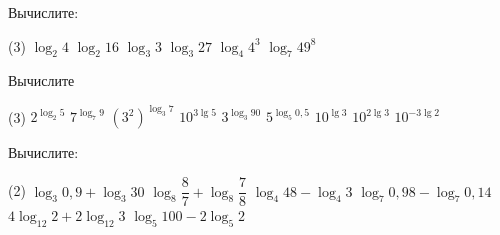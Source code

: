 \begin{class}[number=6]
\begin{listofex}[resume]
\begin{tasks}
		\end{tasks}
		
	\end{listofex}
\end{class}

\begin{homework}[number=3]
	\begin{listofex}
		\item Вычислите:
		\begin{tasks}(3)
			\task \( \log_2 4 \)
			\task \( \log_2 16 \)
			\task \( \log_3 3 \)
			\task \( \log_3 27 \)
			\task \( \log_4 4^3 \)
			\task \( \log_7 49^8 \)
		\end{tasks}
		\item Вычислите
		\begin{tasks}(3)
			\task \( 2^{\log_2 5} \)
			\task \( 7^{\log_7 9} \)
			\task \( (3^2)^{\log_3 7} \)
			\task \( 10^{3\lg 5} \)
			\task \( 3^{\log_3 90} \)
			\task \( 5^{\log_5 0,5} \)
			\task \( 10^{\lg 3} \)
			\task \( 10^{2\lg 3} \)
			\task \( 10^{-3\lg 2} \)
		\end{tasks}
		\item Вычислите:
		\begin{tasks}(2)
			\task \( \log_3 0,9 + \log_3 30 \)
			\task \( \log_8 \dfrac{8}{7} + \log_8 \dfrac{7}{8} \)
			\task \( \log_4 48 - \log_4 3 \)
			\task \( \log_7 0,98 - \log_7 0,14 \)
			\task \( 4\log_{12} 2 + 2\log_{12} 3 \)
			\task \( \log_5 100 - 2 \log_5 2 \)
		\end{tasks}
			
	\end{listofex}
\end{homework}

